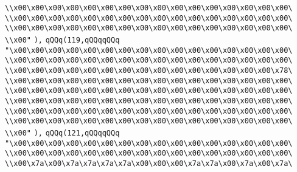 \verb|\\x00\x00\x00\x00\x00\x00\x00\x00\x00\x00\x00\x00\x00\x00\x00\x00\|\newline
\verb|\\x00\x00\x00\x00\x00\x00\x00\x00\x00\x00\x00\x00\x00\x00\x00\x00\|\newline
\verb|\\x00\x00\x00\x00\x00\x00\x00\x00\x00\x00\x00\x00\x00\x00\x00\x00\|\newline
\verb|\\x00"|\newline
\verb|),|\newline
\verb|qQQq(119,qQQqqQQq|\newline
\verb|"\x00\x00\x00\x00\x00\x00\x00\x00\x00\x00\x00\x00\x00\x00\x00\x00\|\newline
\verb|\\x00\x00\x00\x00\x00\x00\x00\x00\x00\x00\x00\x00\x00\x00\x00\x00\|\newline
\verb|\\x00\x00\x00\x00\x00\x00\x00\x00\x00\x00\x00\x00\x00\x00\x00\x78\|\newline
\verb|\\x00\x00\x00\x00\x00\x00\x00\x00\x00\x00\x00\x00\x00\x00\x00\x00\|\newline
\verb|\\x00\x00\x00\x00\x00\x00\x00\x00\x00\x00\x00\x00\x00\x00\x00\x00\|\newline
\verb|\\x00\x00\x00\x00\x00\x00\x00\x00\x00\x00\x00\x00\x00\x00\x00\x00\|\newline
\verb|\\x00\x00\x00\x00\x00\x00\x00\x00\x00\x00\x00\x00\x00\x00\x00\x00\|\newline
\verb|\\x00\x00\x00\x00\x00\x00\x00\x00\x00\x00\x00\x00\x00\x00\x00\x00\|\newline
\verb|\\x00"|\newline
\verb|),|\newline
\verb|qQQq(121,qQQqqQQq|\newline
\verb|"\x00\x00\x00\x00\x00\x00\x00\x00\x00\x00\x00\x00\x00\x00\x00\x00\|\newline
\verb|\\x00\x00\x00\x00\x00\x00\x00\x00\x00\x00\x00\x00\x00\x00\x00\x00\|\newline
\verb|\\x00\x7a\x00\x7a\x7a\x7a\x7a\x00\x00\x00\x7a\x7a\x00\x7a\x00\x7a\|\newline
